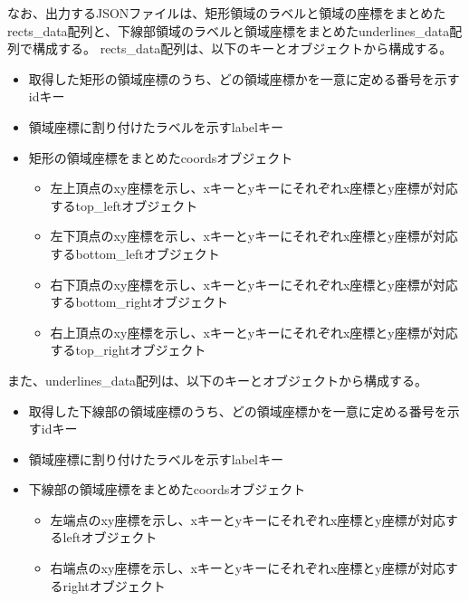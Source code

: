 なお、出力するJSONファイルは、矩形領域のラベルと領域の座標をまとめたrects\_data配列と、下線部領域のラベルと領域座標をまとめたunderlines\_data配列で構成する。
rects\_data配列は、以下のキーとオブジェクトから構成する。

\begin{itemize}
    \item 取得した矩形の領域座標のうち、どの領域座標かを一意に定める番号を示すidキー
    \item 領域座標に割り付けたラベルを示すlabelキー
    \item 矩形の領域座標をまとめたcoordsオブジェクト
    \begin{itemize}
        \item 左上頂点のxy座標を示し、xキーとyキーにそれぞれx座標とy座標が対応するtop\_leftオブジェクト
        \item 左下頂点のxy座標を示し、xキーとyキーにそれぞれx座標とy座標が対応するbottom\_leftオブジェクト
        \item 右下頂点のxy座標を示し、xキーとyキーにそれぞれx座標とy座標が対応するbottom\_rightオブジェクト
        \item 右上頂点のxy座標を示し、xキーとyキーにそれぞれx座標とy座標が対応するtop\_rightオブジェクト
    \end{itemize}
\end{itemize}

また、underlines\_data配列は、以下のキーとオブジェクトから構成する。
\begin{itemize}
    \item 取得した下線部の領域座標のうち、どの領域座標かを一意に定める番号を示すidキー
    \item 領域座標に割り付けたラベルを示すlabelキー
    \item 下線部の領域座標をまとめたcoordsオブジェクト
    \begin{itemize}
        \item 左端点のxy座標を示し、xキーとyキーにそれぞれx座標とy座標が対応するleftオブジェクト
        \item 右端点のxy座標を示し、xキーとyキーにそれぞれx座標とy座標が対応するrightオブジェクト
    \end{itemize}
\end{itemize}

